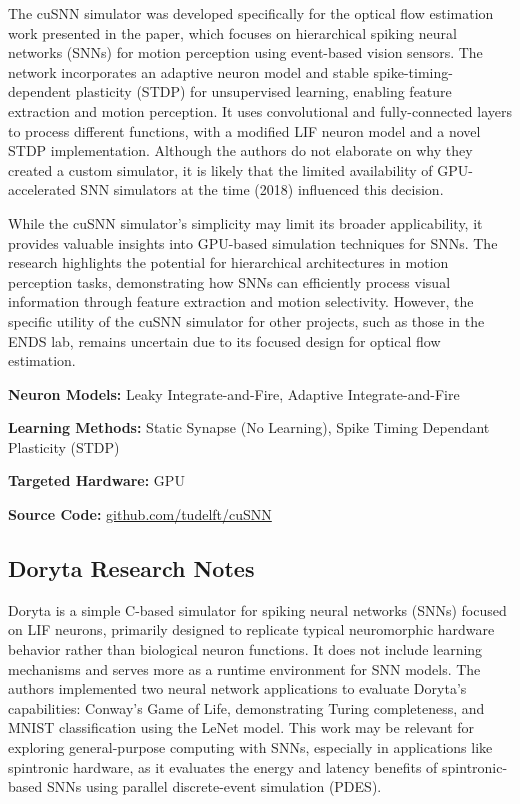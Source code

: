 The cuSNN simulator was developed specifically for the optical flow estimation work presented in the paper, which focuses on hierarchical spiking neural networks (SNNs) for motion perception using event-based vision sensors. The network incorporates an adaptive neuron model and stable spike-timing-dependent plasticity (STDP) for unsupervised learning, enabling feature extraction and motion perception. It uses convolutional and fully-connected layers to process different functions, with a modified LIF neuron model and a novel STDP implementation. Although the authors do not elaborate on why they created a custom simulator, it is likely that the limited availability of GPU-accelerated SNN simulators at the time (2018) influenced this decision.

While the cuSNN simulator's simplicity may limit its broader applicability, it provides valuable insights into GPU-based simulation techniques for SNNs. The research highlights the potential for hierarchical architectures in motion perception tasks, demonstrating how SNNs can efficiently process visual information through feature extraction and motion selectivity. However, the specific utility of the cuSNN simulator for other projects, such as those in the ENDS lab, remains uncertain due to its focused design for optical flow estimation.

\begin{tcolorbox}[enhanced,attach boxed title to top center={yshift=-3mm,yshifttext=-1mm}, colback=blue!5!white,colframe=blue!75!black,colbacktitle=red!80!black, title=cuSNN at a Glance,fonttitle=\bfseries, boxed title style={size=small,colframe=red!50!black} ]

\textbf{Neuron Models:} Leaky Integrate-and-Fire, Adaptive Integrate-and-Fire

\textbf{Learning Methods:} Static Synapse (No Learning), Spike Timing Dependant Plasticity (STDP)  

\textbf{Targeted Hardware:} GPU 

\textbf{Source Code:} \href{https://github.com/tudelft/cuSNN}{github.com/tudelft/cuSNN}
\end{tcolorbox}
\subsection*{Doryta Research Notes}\label{Doryta}

Doryta is a simple C-based simulator for spiking neural networks (SNNs) focused on LIF neurons, primarily designed to replicate typical neuromorphic hardware behavior rather than biological neuron functions. It does not include learning mechanisms and serves more as a runtime environment for SNN models. The authors implemented two neural network applications to evaluate Doryta's capabilities: Conway's Game of Life, demonstrating Turing completeness, and MNIST classification using the LeNet model. This work may be relevant for exploring general-purpose computing with SNNs, especially in applications like spintronic hardware, as it evaluates the energy and latency benefits of spintronic-based SNNs using parallel discrete-event simulation (PDES).


